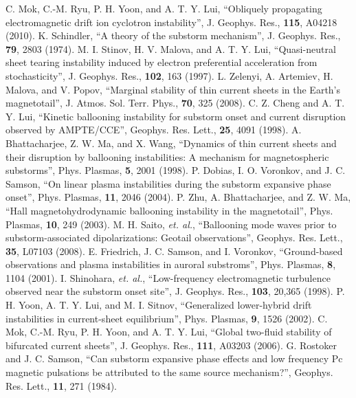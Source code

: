 \documentclass{gshs-report-v1.1}
\begin{document}
\begin{thebibliography}{99}

C. Mok, C.-M. Ryu, P. H. Yoon, and A. T. Y. Lui, ``Obliquely propagating electromagnetic drift ion cyclotron instability'', J. Geophys. Res., {\bf 115}, A04218 (2010).
 K. Schindler, ``A theory of the substorm mechanism'', J. Geophys. Res., {\bf 79}, 2803 (1974).
 M. I. Stinov, H. V. Malova, and A. T. Y. Lui, ``Quasi-neutral sheet tearing instability induced by electron preferential acceleration from stochasticity'', J. Geophys. Res., {\bf 102}, 163 (1997).
 L. Zelenyi, A. Artemiev, H. Malova, and V. Popov, ``Marginal stability of thin current sheets in the Earth's magnetotail'', J. Atmos. Sol. Terr. Phys., {\bf 70}, 325 (2008).
 C. Z. Cheng and A. T. Y. Lui, ``Kinetic ballooning instability for substorm onset and current disruption observed by AMPTE/CCE'', Geophys. Res. Lett., {\bf 25}, 4091 (1998).
 A. Bhattacharjee, Z. W. Ma, and X. Wang, ``Dynamics of thin current sheets and their disruption by ballooning instabilities: A mechanism for magnetospheric substorms'', Phys. Plasmas, {\bf 5}, 2001 (1998).
 P. Dobias, I. O. Voronkov, and J. C. Samson, ``On linear plasma instabilities during the substorm expansive phase onset'', Phys. Plasmas, {\bf 11}, 2046 (2004).
 P. Zhu, A. Bhattacharjee, and Z. W. Ma, ``Hall magnetohydrodynamic ballooning instability in the magnetotail'', Phys. Plasmas, {\bf 10}, 249 (2003).
 M. H. Saito, {\it et. al.}, ``Ballooning mode waves prior to substorm-associated dipolarizations: Geotail observations'', Geophys. Res. Lett., {\bf 35}, L07103 (2008).
 E. Friedrich, J. C. Samson, and I. Voronkov, ``Ground-based observations and plasma instabilities in auroral substroms'', Phys. Plasmas, {\bf 8}, 1104 (2001).
 I. Shinohara, {\it et. al.}, ``Low-frequency electromagnetic turbulence observed near the substorm onset site'', J. Geophys. Res., {\bf 103}, 20,365 (1998).
 P. H. Yoon, A. T. Y. Lui, and M. I. Sitnov, ``Generalized lower-hybrid drift instabilities in current-sheet equilibrium'', Phys. Plasmas, {\bf 9}, 1526 (2002).
C. Mok, C.-M. Ryu, P. H. Yoon, and A. T. Y. Lui, ``Global two-fluid stability of bifurcated current sheets'', J. Geophys. Res., {\bf 111}, A03203 (2006).
 G. Rostoker and J. C. Samson, ``Can substorm expansive phase effects and low frequency Pc magnetic pulsations be attributed to the same source mechanism?'', Geophys. Res. Lett., {\bf 11}, 271 (1984).

\end{thebibliography}
\end{document}
